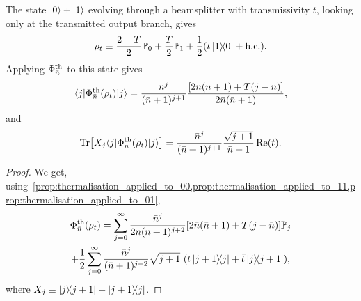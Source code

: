 \documentclass[12pt]{report}
\newcommand{\PP}{\mathbb{P}}
\begin{document}
\begin{prop}
	The state $\ket0+\ket1$ evolving through a beamsplitter with transmissivity $t$, looking only at the transmitted output branch, gives
	\begin{equation}
		\rho_t
		\equiv
		\frac{2-T}{2} \PP_0
		+ \frac{T}{2} \PP_1
		+ \frac12 (t \ketbra{1}{0} + \mathrm{h.c.}).
	\end{equation}
	Applying $\Phi^{\rm th}_{\bar n}$ to this state gives
	\begin{equation}
	\begin{gathered}
		\langle j|\Phi^{\rm th}_{\bar n}(\rho_t)|j\rangle
		= \frac{\bar n^j}{(\bar n + 1)^{j+1}}
		\frac{[2\bar n(\bar n+1) + T(j-\bar n)]}{2\bar n(\bar n+1)},
	\end{gathered}
	\end{equation}
	and
	\begin{equation}
		\Tr[X_{j}\langle j|\Phi^{\rm th}_{\bar n}(\rho_t)|j\rangle]
		= \frac{\bar n^j}{(\bar n+1)^{j+1}} \frac{\sqrt{j+1}}{\bar n+ 1}
		\Re(t).
	\end{equation}
\end{prop}
\begin{proof}
	We get, using~\cref{prop:thermalisation_applied_to_00,prop:thermalisation_applied_to_11,prop:thermalisation_applied_to_01},
	\begin{equation}
	\begin{gathered}
		\Phi_{\bar n}^{\rm th}(\rho_t)
		= \sum_{j=0}^\infty
		\frac{\bar n^j}{2\bar n(\bar n + 1)^{j+2}}
		[2\bar n(\bar n+1) + T(j-\bar n)]
		\PP_j \\
		+ \frac{1}{2}\sum_{j=0}^\infty
		\frac{\bar n^j}{(\bar n + 1)^{j+2}} \sqrt{j+1} \,\,
		(t\ketbra{j+1}{j} + \bar t \ketbra{j}{j+1}),
	\end{gathered}
	\end{equation}
	where $X_j \equiv \ketbra{j}{j+1} + \ketbra{j+1}{j}$.
\end{proof}
\end{document}
